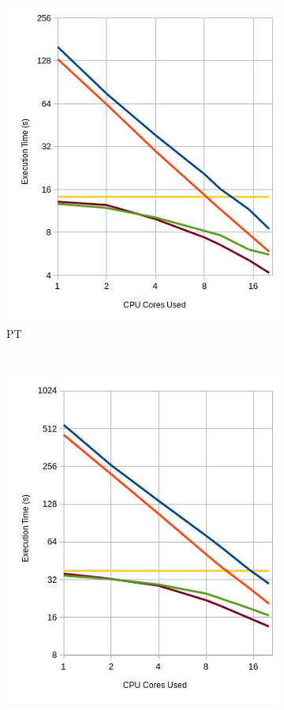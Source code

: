 \begin{figure}[H]

\centering

\begin{subfigure}[h]{0.45\textwidth}
\includegraphics[width=\textwidth]{img/ptTexec.jpg}
\caption{\label{img:ptTexec} PT}
\end{subfigure}
~
\begin{subfigure}[h]{0.45\textwidth}
\includegraphics[width=\textwidth]{img/bptTexec.jpg}

\end{subfigure}
\end{figure}

